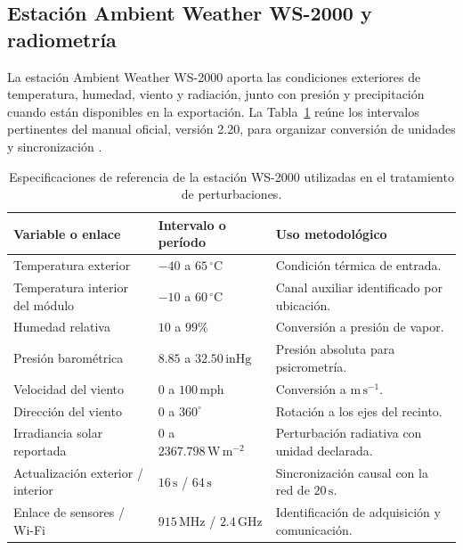 \subsection{Estación Ambient Weather WS-2000 y radiometría}

La estación Ambient Weather WS-2000 aporta las condiciones exteriores de temperatura, humedad, viento y radiación, junto con presión y precipitación cuando están disponibles en la exportación. La Tabla~\ref{met:tabla_ws2000} reúne los intervalos pertinentes del manual oficial, versión 2.20, para organizar conversión de unidades y sincronización \cite{ambient_ws2000_2025}.

\begin{table}[htbp]
\centering
\small
\caption{Especificaciones de referencia de la estación WS-2000 utilizadas en el tratamiento de perturbaciones.}
\label{met:tabla_ws2000}
\begingroup
\renewcommand{\arraystretch}{1.25}
\begin{tabularx}{\textwidth}{>{\raggedright\arraybackslash}p{}>{\raggedright\arraybackslash}p{}>{\raggedright\arraybackslash}X}
\toprule
Variable o enlace & Intervalo o período & Uso metodológico \\
\midrule
Temperatura exterior & $-40$ a $65\,^{\circ}\mathrm C$ & Condición térmica de entrada. \\
Temperatura interior del módulo & $-10$ a $60\,^{\circ}\mathrm C$ & Canal auxiliar identificado por ubicación. \\
Humedad relativa & $10$ a $99\%$ & Conversión a presión de vapor. \\
Presión barométrica & $8.85$ a $32.50\,\mathrm{inHg}$ & Presión absoluta para psicrometría. \\
Velocidad del viento & $0$ a $100\,\mathrm{mph}$ & Conversión a $\mathrm{m\,s^{-1}}$. \\
Dirección del viento & $0$ a $360^{\circ}$ & Rotación a los ejes del recinto. \\
Irradiancia solar reportada & $0$ a $2367.798\,\mathrm{W\,m^{-2}}$ & Perturbación radiativa con unidad declarada. \\
Actualización exterior / interior & $16\,\mathrm s$ / $64\,\mathrm s$ & Sincronización causal con la red de $20\,\mathrm s$. \\
Enlace de sensores / Wi-Fi & $915\,\mathrm{MHz}$ / $2.4\,\mathrm{GHz}$ & Identificación de adquisición y comunicación. \\
\bottomrule
\end{tabularx}
\endgroup
\end{table}

